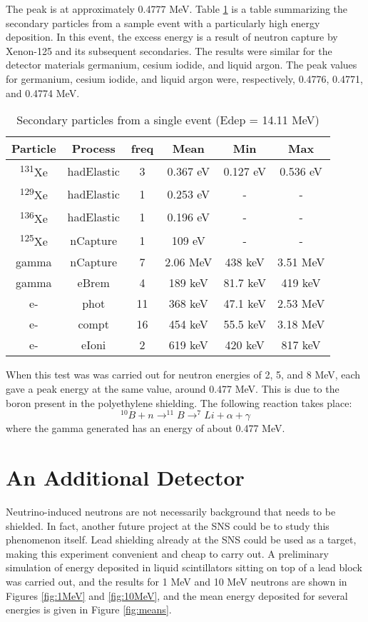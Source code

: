 \documentclass[12pt]{article}
\begin{document}
The peak is at approximately 0.4777 MeV. Table \ref{table:xenon} is a table summarizing the secondary particles from a sample event with a particularly high energy deposition. In this event, the excess energy is a result of neutron capture by Xenon-125 and its subsequent secondaries. The results were similar for the detector materials germanium, cesium iodide, and liquid argon. The peak values for germanium, cesium iodide, and liquid argon were, respectively, 0.4776, 0.4771, and 0.4774 MeV.

\begin{table}[H]
  \caption{Secondary particles from a single event (Edep = 14.11 MeV)}
  \centering
  \begin{tabular}{c c c c c c}
  \hline\hline
  Particle & Process & freq & Mean & Min & Max \\
  \hline
  \textsuperscript{131}Xe & hadElastic & 3 & 0.367 eV & 0.127 eV & 0.536 eV \\
  \textsuperscript{129}Xe & hadElastic & 1 & 0.253 eV & - & - \\
  \textsuperscript{136}Xe & hadElastic & 1 & 0.196 eV & - & - \\
  \textsuperscript{125}Xe & nCapture   & 1 & 109 eV   & - & - \\
  gamma & nCapture & 7  & 2.06 MeV & 438 keV  & 3.51 MeV \\
  gamma & eBrem    & 4  & 189 keV  & 81.7 keV & 419 keV  \\
  e-    & phot     & 11 & 368 keV  & 47.1 keV & 2.53 MeV \\
  e-    & compt    & 16 & 454 keV  & 55.5 keV & 3.18 MeV \\
  e-    & eIoni    & 2  & 619 keV  & 420 keV  & 817 keV  \\
  \hline
  \end{tabular}
  \label{table:xenon}
\end{table}

When this test was was carried out for neutron energies of 2, 5, and 8 MeV, each gave a peak energy at the same value, around 0.477 MeV. This is due to the boron present in the polyethylene shielding. The following reaction takes place:
$$^{10}B + n \rightarrow ^{11}B \rightarrow ^{7}Li + \alpha + \gamma$$
where the gamma generated has an energy of about 0.477 MeV.

\section{An Additional Detector}
Neutrino-induced neutrons are not necessarily background that needs to be shielded. In fact, another future project at the SNS could be to study this phenomenon itself. Lead shielding already at the SNS could be used as a target, making this experiment convenient and cheap to carry out. A preliminary simulation of energy deposited in liquid scintillators sitting on top of a lead block was carried out, and the results for 1 MeV and 10 MeV neutrons are shown in Figures \ref{fig:1MeV} and \ref{fig:10MeV}, and the mean energy deposited for several energies is given in Figure \ref{fig:means}.
\end{document}
